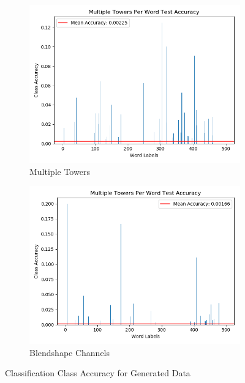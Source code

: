 \begin{figure}[h!]
    \centering
    \begin{subfigure}[b]{0.49\textwidth}
        \includegraphics[width=\textwidth]{figures/gan/multiple_towers_acc.png}
        \caption{Multiple Towers}\label{fig:gan_multi_towers}
    \end{subfigure}
    \begin{subfigure}[b]{0.49\textwidth}
        \includegraphics[width=\textwidth]{figures/gan/channels_acc.png}
        \caption{Blendshape Channels}\label{fig:gan_blendshape_channels}
    \end{subfigure}
    \caption{Classification Class Accuracy for Generated Data}\label{fig:gan_class_acc}
\end{figure}
